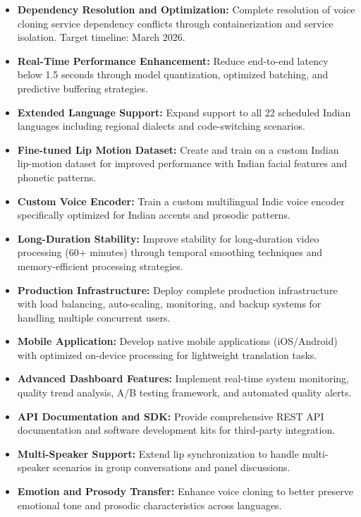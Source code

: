\documentclass[12pt,oneside]{report}
\begin{document}
\begin{itemize}
    \item \textbf{Dependency Resolution and Optimization:} Complete resolution of voice cloning service dependency conflicts through containerization and service isolation. Target timeline: March 2026.
    
    \item \textbf{Real-Time Performance Enhancement:} Reduce end-to-end latency below 1.5 seconds through model quantization, optimized batching, and predictive buffering strategies.
    
    \item \textbf{Extended Language Support:} Expand support to all 22 scheduled Indian languages including regional dialects and code-switching scenarios.
    
    \item \textbf{Fine-tuned Lip Motion Dataset:} Create and train on a custom Indian lip-motion dataset for improved performance with Indian facial features and phonetic patterns.
    
    \item \textbf{Custom Voice Encoder:} Train a custom multilingual Indic voice encoder specifically optimized for Indian accents and prosodic patterns.
    
    \item \textbf{Long-Duration Stability:} Improve stability for long-duration video processing (60+ minutes) through temporal smoothing techniques and memory-efficient processing strategies.
    
    \item \textbf{Production Infrastructure:} Deploy complete production infrastructure with load balancing, auto-scaling, monitoring, and backup systems for handling multiple concurrent users.
    
    \item \textbf{Mobile Application:} Develop native mobile applications (iOS/Android) with optimized on-device processing for lightweight translation tasks.
    
    \item \textbf{Advanced Dashboard Features:} Implement real-time system monitoring, quality trend analysis, A/B testing framework, and automated quality alerts.
    
    \item \textbf{API Documentation and SDK:} Provide comprehensive REST API documentation and software development kits for third-party integration.
    
    \item \textbf{Multi-Speaker Support:} Extend lip synchronization to handle multi-speaker scenarios in group conversations and panel discussions.
    
    \item \textbf{Emotion and Prosody Transfer:} Enhance voice cloning to better preserve emotional tone and prosodic characteristics across languages.
\end{itemize}
\end{document}
